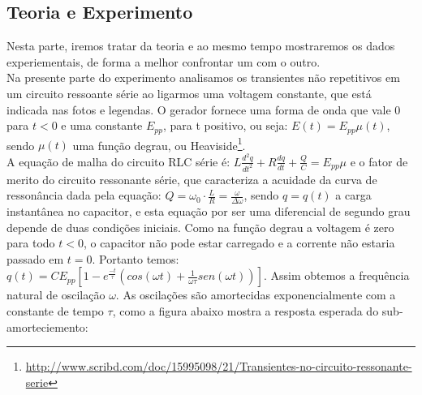 \documentclass[12pt,letterpaper]{article}
\begin{document}
\subsection{Teoria e Experimento}
Nesta parte, iremos tratar da teoria e ao mesmo tempo mostraremos os dados experiementais, de forma a melhor confrontar um com o outro.\\
Na presente parte do experimento analisamos os transientes não repetitivos em um circuito ressoante série ao ligarmos uma voltagem constante, que está indicada nas fotos e legendas. O gerador fornece uma forma de onda que vale 0 para $t < 0$ e uma constante $E_{pp}$, para t positivo, ou seja: $E(t) = E_{pp}\mu (t)$, sendo $\mu (t)$ uma função degrau, ou Heaviside\footnote{\url{http://www.scribd.com/doc/15995098/21/Transientes-no-circuito-ressonante-serie}}.\\
A equação de malha do circuito RLC série é: $ L \frac{d^2q}{dt^2} + R\frac{dq}{dt} +\frac{Q}{C} = E_{pp}\mu$ e o fator de merito do circuito ressonante série, que caracteriza a acuidade da curva de ressonância dada pela equação: $ Q = \omega_0 \cdot \frac{L}{R} = \frac{\omega}{\Delta \omega}$, sendo $q = q(t)$ a carga instantânea no capacitor, e esta equação por ser uma diferencial de segundo grau depende de duas condições iniciais. Como na função degrau a voltagem é zero para todo $t < 0$, o capacitor não pode estar carregado e a corrente não estaria passado em $t = 0$. Portanto temos: $ q(t) = C E_{pp}[1 - e^{\frac{-t}{\tau}}(cos(\omega t) + \frac{1}{\omega \tau}sen(\omega t))]$. Assim obtemos a frequência natural de oscilação $\omega$. As oscilações são amortecidas exponencialmente com a constante de tempo $\tau$, como a figura abaixo mostra a resposta esperada do sub-amorteciemento:
\end{document}
